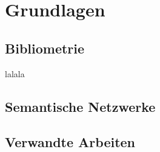 \section{Grundlagen}
\subsection{Bibliometrie}
lalala
\subsection{Semantische Netzwerke}
\subsection{Verwandte Arbeiten}
